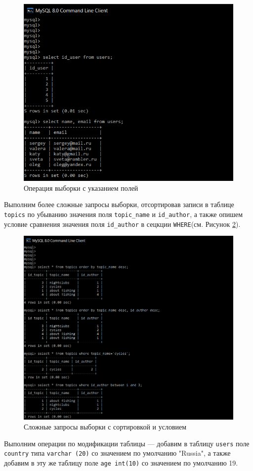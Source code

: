 \documentclass[a4paper,14pt]{extarticle}
\begin{document}
\begin{figure}[h!]
	\centering
	\includegraphics[width=0.6\linewidth]{images/field-select}
	\caption{Операция выборки с указанием полей}
	\label{fig:field-select}
\end{figure}


Выполним более сложные запросы выборки, отсортировав записи в таблице \texttt{topics} по убыванию значения поля \texttt{topic\_name} и \texttt{id\_author}, а также опишем условие сравнения значения поля \texttt{id\_author} в сецкции \texttt{WHERE}(см. Рисунок \ref{fig:order-where-forum}). 

\begin{figure}[h!]
	\centering
	\includegraphics[width=0.6\linewidth]{images/order-where-forum}
	\caption{Сложные запросы выборки с сортировкой и условием}
	\label{fig:order-where-forum}
\end{figure}

Выполним операции по модификации таблицы --- добавим в таблицу \texttt{users} поле \texttt{country} типа \texttt{varchar (20)} со значением по умолчанию "Russia", а также добавим в эту же таблицу поле \texttt{age int(10)} со значением по умолчанию 19. 
\end{document}
